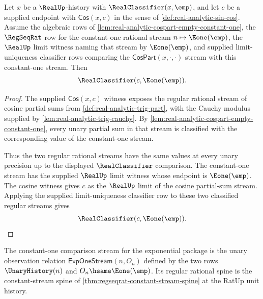 \begin{theorem}
\label{thm:real-analytic-cos-empty-constant-one}
Let $x$ be a $\RealUp$-history with $\RealClassifier(x,\emp)$, and let $c$ be a supplied endpoint with $\mathsf{Cos}(x,c)$ in the sense of \autoref{def:real-analytic-sin-cos}. Assume the algebraic rows of \autoref{lem:real-analytic-cospart-empty-constant-one}, the $\RegSeqRat$ row for the constant-one rational stream $n\mapsto \Eone(\emp)$, the $\RealUp$ limit witness naming that stream by $\Eone(\emp)$, and supplied limit-uniqueness classifier rows comparing the $\mathsf{CosPart}(x,\cdot,\cdot)$ stream with this constant-one stream. Then
$$
\RealClassifier(c,\Eone(\emp)).
$$
\end{theorem}
\begin{proof}
The supplied $\mathsf{Cos}(x,c)$ witness exposes the regular rational stream of cosine partial sums from \autoref{def:real-analytic-trig-part}, with the Cauchy modulus supplied by \autoref{lem:real-analytic-trig-cauchy}. By \autoref{lem:real-analytic-cospart-empty-constant-one}, every unary partial sum in that stream is classified with the corresponding value of the constant-one stream.

Thus the two regular rational streams have the same values at every unary precision up to the displayed $\RealClassifier$ comparison. The constant-one stream has the supplied $\RealUp$ limit witness whose endpoint is $\Eone(\emp)$. The cosine witness gives $c$ as the $\RealUp$ limit of the cosine partial-sum stream. Applying the supplied limit-uniqueness classifier row to these two classified regular streams gives
$$
\RealClassifier(c,\Eone(\emp)).
$$
\end{proof}

\begin{definition}
\label{def:real-analytic-exp-one-stream}
The constant-one comparison stream for the exponential package is the unary observation relation $\mathsf{ExpOneStream}(n,O_n)$ defined by the two rows $\UnaryHistory(n)$ and $O_n\hsame\Eone(\emp)$. Its regular rational spine is the constant-stream spine of \autoref{thm:regseqrat-constant-stream-spine} at the RatUp unit history.
\end{definition}

